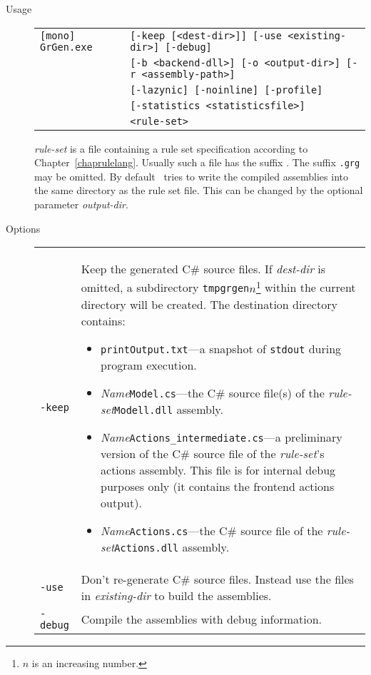 \begin{description}
  \item[Usage] \begin{tabular*}{\linewidth}{@{}l@{}l}\texttt{[mono] GrGen.exe } & \texttt{[-keep [<dest-dir>]] [-use <existing-dir>] [-debug]}\\
        &\texttt{[-b <backend-dll>] [-o <output-dir>] [-r <assembly-path>]}\\
        &\texttt{[-lazynic] [-noinline] [-profile]}\\
        &\texttt{[-statistics <statisticsfile>]}\\
        &\texttt{<rule-set>}\end{tabular*}
    \emph{rule-set} is a file containing a rule set specification according to Chapter~\ref{chaprulelang}. Usually such a file has the suffix \texttt{}. The suffix \texttt{.grg} may be omitted.
By default \GrG\ tries to write the compiled assemblies into the same directory as the rule set file. This can be changed by the optional parameter \emph{output-dir}.
  \item[Options] \mbox{}
    \begin{tabularx}{\linewidth}{lX}
      \texttt{-keep} & Keep the generated C\# source files. If \emph{dest-dir} is omitted, a subdirectory \texttt{tmpgrgen$n$}\footnote{$n$ is an increasing number.} within the current directory will be created. The destination directory contains:
\begin{itemize}
  \item \texttt{printOutput.txt}---a snapshot of \texttt{stdout} during program execution.
  \item \emph{Name}\texttt{Model.cs}---the C\# source file(s) of the \emph{rule-set}\texttt{Modell.dll} assembly.
  \item \emph{Name}\texttt{Actions\_intermediate.cs}---a preliminary version of the C\# source file of the \emph{rule-set}'s actions assembly.
	This file is for internal debug purposes only (it contains the frontend actions output).
  \item \emph{Name}\texttt{Actions.cs}---the C\# source file of the \emph{rule-set}\texttt{Actions.dll} assembly.
\end{itemize}\\
      \texttt{-use} & Don't re-generate C\# source files. Instead use the files in \emph{existing-dir} to build the assemblies.\\
      \texttt{-debug} & Compile the assemblies with debug information.\\

\end{tabularx}
\end{description}
